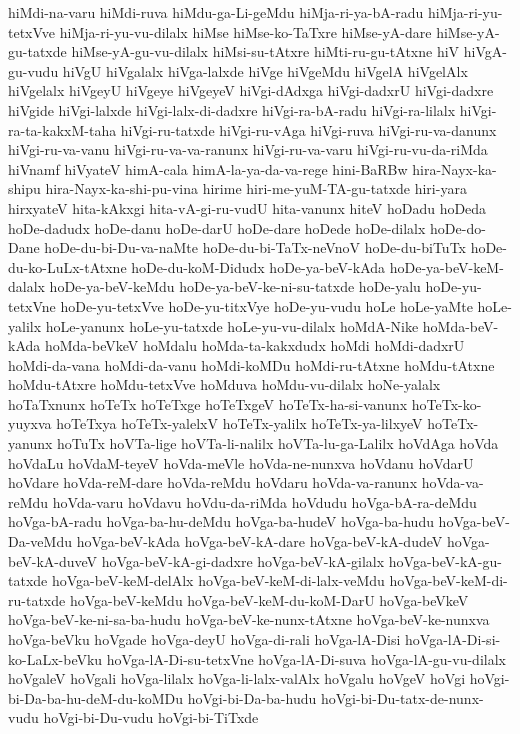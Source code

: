 {hiMdi-na-varu
hiMdi-ruva
hiMdu-ga-Li-geMdu
hiMja-ri-ya-bA-radu
hiMja-ri-yu-tetxVve
hiMja-ri-yu-vu-dilalx
hiMse
hiMse-ko-TaTxre
hiMse-yA-dare
hiMse-yA-gu-tatxde
hiMse-yA-gu-vu-dilalx
hiMsi-su-tAtxre
hiMti-ru-gu-tAtxne
hiV
hiVgA-gu-vudu
hiVgU
hiVgalalx
hiVga-lalxde
hiVge
hiVgeMdu
hiVgelA
hiVgelAlx
hiVgelalx
hiVgeyU
hiVgeye
hiVgeyeV
hiVgi-dAdxga
hiVgi-dadxrU
hiVgi-dadxre
hiVgide
hiVgi-lalxde
hiVgi-lalx-di-dadxre
hiVgi-ra-bA-radu
hiVgi-ra-lilalx
hiVgi-ra-ta-kakxM-taha
hiVgi-ru-tatxde
hiVgi-ru-vAga
hiVgi-ruva
hiVgi-ru-va-danunx
hiVgi-ru-va-vanu
hiVgi-ru-va-va-ranunx
hiVgi-ru-va-varu
hiVgi-ru-vu-da-riMda
hiVnamf
hiVyateV
himA-cala
himA-la-ya-da-va-rege
hini-BaRBw
hira-Nayx-ka-shipu
hira-Nayx-ka-shi-pu-vina
hirime
hiri-me-yuM-TA-gu-tatxde
hiri-yara
hirxyateV
hita-kAkxgi
hita-vA-gi-ru-vudU
hita-vanunx
hiteV
hoDadu
hoDeda
hoDe-dadudx
hoDe-danu
hoDe-darU
hoDe-dare
hoDede
hoDe-dilalx
hoDe-do-Dane
hoDe-du-bi-Du-va-naMte
hoDe-du-bi-TaTx-neVnoV
hoDe-du-biTuTx
hoDe-du-ko-LuLx-tAtxne
hoDe-du-koM-Didudx
hoDe-ya-beV-kAda
hoDe-ya-beV-keM-dalalx
hoDe-ya-beV-keMdu
hoDe-ya-beV-ke-ni-su-tatxde
hoDe-yalu
hoDe-yu-tetxVne
hoDe-yu-tetxVve
hoDe-yu-titxVye
hoDe-yu-vudu
hoLe
hoLe-yaMte
hoLe-yalilx
hoLe-yanunx
hoLe-yu-tatxde
hoLe-yu-vu-dilalx
hoMdA-Nike
hoMda-beV-kAda
hoMda-beVkeV
hoMdalu
hoMda-ta-kakxdudx
hoMdi
hoMdi-dadxrU
hoMdi-da-vana
hoMdi-da-vanu
hoMdi-koMDu
hoMdi-ru-tAtxne
hoMdu-tAtxne
hoMdu-tAtxre
hoMdu-tetxVve
hoMduva
hoMdu-vu-dilalx
hoNe-yalalx
hoTaTxnunx
hoTeTx
hoTeTxge
hoTeTxgeV
hoTeTx-ha-si-vanunx
hoTeTx-ko-yuyxva
hoTeTxya
hoTeTx-yalelxV
hoTeTx-yalilx
hoTeTx-ya-lilxyeV
hoTeTx-yanunx
hoTuTx
hoVTa-lige
hoVTa-li-nalilx
hoVTa-lu-ga-Lalilx
hoVdAga
hoVda
hoVdaLu
hoVdaM-teyeV
hoVda-meVle
hoVda-ne-nunxva
hoVdanu
hoVdarU
hoVdare
hoVda-reM-dare
hoVda-reMdu
hoVdaru
hoVda-va-ranunx
hoVda-va-reMdu
hoVda-varu
hoVdavu
hoVdu-da-riMda
hoVdudu
hoVga-bA-ra-deMdu
hoVga-bA-radu
hoVga-ba-hu-deMdu
hoVga-ba-hudeV
hoVga-ba-hudu
hoVga-beV-Da-veMdu
hoVga-beV-kAda
hoVga-beV-kA-dare
hoVga-beV-kA-dudeV
hoVga-beV-kA-duveV
hoVga-beV-kA-gi-dadxre
hoVga-beV-kA-gilalx
hoVga-beV-kA-gu-tatxde
hoVga-beV-keM-delAlx
hoVga-beV-keM-di-lalx-veMdu
hoVga-beV-keM-di-ru-tatxde
hoVga-beV-keMdu
hoVga-beV-keM-du-koM-DarU
hoVga-beVkeV
hoVga-beV-ke-ni-sa-ba-hudu
hoVga-beV-ke-nunx-tAtxne
hoVga-beV-ke-nunxva
hoVga-beVku
hoVgade
hoVga-deyU
hoVga-di-rali
hoVga-lA-Disi
hoVga-lA-Di-si-ko-LaLx-beVku
hoVga-lA-Di-su-tetxVne
hoVga-lA-Di-suva
hoVga-lA-gu-vu-dilalx
hoVgaleV
hoVgali
hoVga-lilalx
hoVga-li-lalx-valAlx
hoVgalu
hoVgeV
hoVgi
hoVgi-bi-Da-ba-hu-deM-du-koMDu
hoVgi-bi-Da-ba-hudu
hoVgi-bi-Du-tatx-de-nunx-vudu
hoVgi-bi-Du-vudu
hoVgi-bi-TiTxde
}
